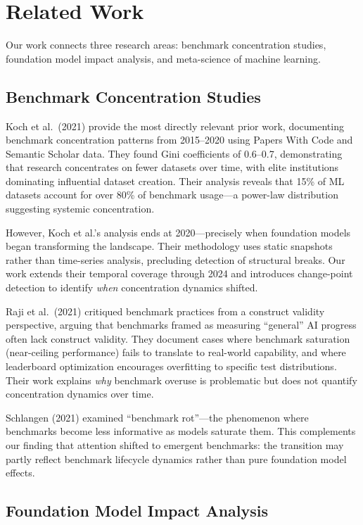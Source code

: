\section{Related Work}
\label{sec:related_work}

Our work connects three research areas: benchmark concentration studies, foundation model impact analysis, and meta-science of machine learning.

\subsection{Benchmark Concentration Studies}

Koch et al.\ (2021) provide the most directly relevant prior work, documenting benchmark concentration patterns from 2015--2020 using Papers With Code and Semantic Scholar data. They found Gini coefficients of 0.6--0.7, demonstrating that research concentrates on fewer datasets over time, with elite institutions dominating influential dataset creation. Their analysis reveals that 15\% of ML datasets account for over 80\% of benchmark usage---a power-law distribution suggesting systemic concentration.

However, Koch et al.'s analysis ends at 2020---precisely when foundation models began transforming the landscape. Their methodology uses static snapshots rather than time-series analysis, precluding detection of structural breaks. Our work extends their temporal coverage through 2024 and introduces change-point detection to identify \emph{when} concentration dynamics shifted.

Raji et al.\ (2021) critiqued benchmark practices from a construct validity perspective, arguing that benchmarks framed as measuring ``general'' AI progress often lack construct validity. They document cases where benchmark saturation (near-ceiling performance) fails to translate to real-world capability, and where leaderboard optimization encourages overfitting to specific test distributions. Their work explains \emph{why} benchmark overuse is problematic but does not quantify concentration dynamics over time.

Schlangen (2021) examined ``benchmark rot''---the phenomenon where benchmarks become less informative as models saturate them. This complements our finding that attention shifted to emergent benchmarks: the transition may partly reflect benchmark lifecycle dynamics rather than pure foundation model effects.

\subsection{Foundation Model Impact Analysis}

